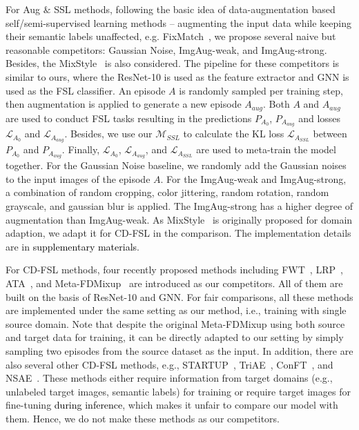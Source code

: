 \documentclass{article}
\newcommand{\fyq}{\textcolor{black}}
\begin{document}
For Aug $\&$ SSL methods, following the basic idea of data-augmentation based self/semi-supervised learning methods -- augmenting the input data while keeping their semantic labels unaffected, e.g. FixMatch~\cite{sohn2020fixmatch}, we propose several naive but reasonable competitors: Gaussian Noise, ImgAug-weak, and ImgAug-strong. Besides, the MixStyle~\cite{zhou2021domain} is also considered.
The pipeline for these competitors is similar to ours, where the ResNet-10 is used as the feature extractor and GNN is used as the FSL classifier. An episode $A$ is randomly sampled per training step, then augmentation is applied to generate a new episode $A_{aug}$.  Both $A$ and $A_{aug}$ are used to conduct FSL tasks resulting in the predictions $P_{A_0}$, $P_{A_{aug}}$ and losses $\mathcal{L}_{A_{0}}$ and $\mathcal{L}_{A_{aug}}$.  Besides, we use our $\mathcal{M}_{SSL}$ to calculate the KL loss $\mathcal{L}_{A_{SSL}}$ between $P_{A_0}$ and $P_{A_{aug}}$. Finally, $\mathcal{L}_{A_0}$, $\mathcal{L}_{A_{aug}}$, and $\mathcal{L}_{A_{SSL}}$ are used to meta-train the model together. For the Gaussian Noise baseline, we randomly add the Gaussian noises to the input images of the episode $A$. For the ImgAug-weak and ImgAug-strong, a combination of random cropping, color jittering, random rotation, random grayscale, and gaussian blur is applied. The ImgAug-strong has a higher degree of augmentation than ImgAug-weak. As MixStyle~\cite{zhou2021domain} is originally proposed for domain adaption, we adapt it for CD-FSL in the comparison. The implementation details are in \fyq{supplementary materials}.

For CD-FSL methods, four recently proposed methods including FWT~\cite{tseng2020cross}, LRP~\cite{sun2021explanation}, ATA~\cite{wang2021cross}, and Meta-FDMixup~\cite{fu2021meta} are introduced as our competitors. All of them are built on the basis of ResNet-10 and GNN. For fair comparisons, all these methods are implemented under the same setting as our method, i.e., training with single source domain. Note that despite the original Meta-FDMixup using both source and target data for training, it can be directly adapted to our setting by simply sampling two episodes from the source dataset as the input.
In addition, there are also several other CD-FSL methods, e.g., STARTUP~\cite{phoo2020self}, TriAE~\cite{guan2020large}, ConFT~\cite{das2021importance}, and NSAE~\cite{liang2021boosting}. These methods either require information from target domains (e.g., unlabeled target images, semantic labels) for training or require target images for fine-tuning \fyq{during inference}, which makes it unfair to compare our model with them. Hence, we do not make these methods as our competitors. 
\end{document}
